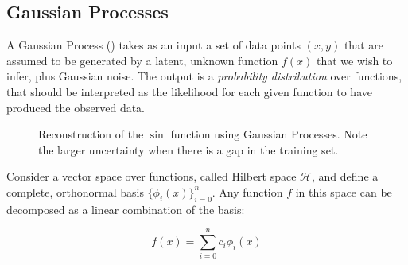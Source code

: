\subsection{Gaussian Processes}
A Gaussian Process (\GP) takes as an input a set of data points $(x, y)$ that are assumed to be generated by a latent, unknown function $f(x)$ that we wish to infer, plus Gaussian noise. The output is a \emph{probability distribution} over functions, that should be interpreted as the likelihood for each given function to have produced the observed data.


\begin{figure}[htb]
	\centering
	\hfil
	\caption{Reconstruction of the $\sin$ function using Gaussian Processes.
	Note the larger uncertainty when there is a gap in the training set.}\label{fig:gp_toy}
\end{figure}


Consider a vector space over functions,  called Hilbert space $\mathscr{H}$, and define a complete, orthonormal basis $\{\phi_i(x)\}_{i=0}^{n}$.
Any function $f$ in this space can be decomposed as a linear combination of the basis:

 \[f(x) = \sum_{i=0}^{n} c_i \phi_i(x)\]
 
